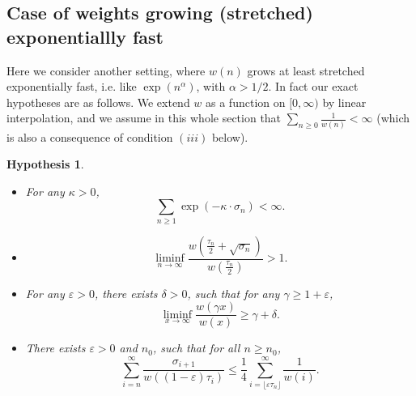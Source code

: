 \documentclass[11pt]{article}
\newtheorem {Hypo} {Hypothesis} [section]
\newcommand{\1}{{\text{\Large $\mathfrak 1$}}}
\begin{document}
\subsection{Case of weights growing (stretched) exponentiallly fast}\label{sec:GPU3}
Here we consider another setting, where $w(n)$ grows at least stretched exponentially fast, i.e. like $\exp(n^\alpha)$, with $\alpha>1/2$. In fact our exact hypotheses are as follows. We extend $w$ as a function on $[0,\infty)$ by linear interpolation, and we assume in this whole section that $\sum_{n\ge 0} \frac 1{w(n)}<\infty$ (which is also a consequence of condition $(iii)$ below).  

\begin{Hypo}\label{hypo}
\begin{itemize}
\item[$(i)$] For any $\kappa>0$, 
$$\sum_{n\ge 1} \exp(-\kappa \cdot\sigma_n)<\infty. $$ 
\item[$(ii)$] $$\liminf_{n\to \infty} \frac{w( \frac{\tau_n}{2} + \sqrt{\sigma_n})}{w(\frac{\tau_n}{2})} >1. $$ 
\item[$(iii)$]  For any $\varepsilon>0$, there exists $\delta>0$, such that for any $\gamma\ge 1+\varepsilon$, 
$$\liminf_{x\to \infty} \frac{w(\gamma x)}{w(x)} \ge  \gamma + \delta. $$ 
\item[$(iv)$]  There exists $\varepsilon>0$ and $n_0$, such that for all $n\ge n_0$,  
$$\sum_{i=n}^\infty \frac{\sigma_{i+1}}{w((1-\varepsilon)\tau_i)} \le \frac 14 \sum_{i = \lfloor \varepsilon \tau_n\rfloor }^\infty \frac 1{w(i)}. $$ 
\end{itemize}
\end{Hypo}
\end{document}

